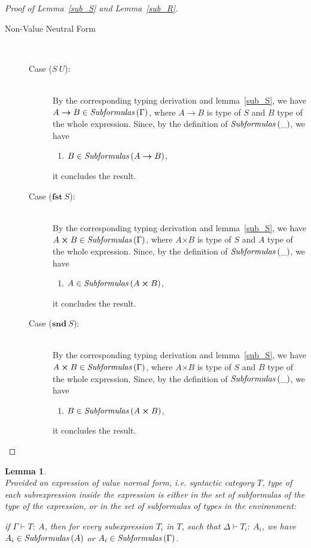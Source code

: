 \documentclass[a4paper]{article}
\newcommand{\typecolor}{}
\newcommand{\termcolor}{}
\newcommand{\tp}[1]{{\typecolor #1}}
\newcommand{\tm}[1]{{\termcolor #1}}
\newtheorem{lemma}[theorem]{Lemma}
\newcommand{\typarr}[2]{#1\boldsymbol{\rightarrow}#2}
\newcommand{\typprd}[2]{#1\boldsymbol{\times}#2}
\newcommand{\expapp}[2]{#1\ #2}
\newcommand{\expfst}[1]{\mathbf{fst}\ #1}
\newcommand{\expsnd}[1]{\mathbf{snd}\ #1}
\newcommand{\typing}[2]{\tm{#1:\ }\tp{#2}}
\newcommand{\txt}[1]{\text{\textit{#1}}}
\newcommand{\subformulas}[1]{\txt{Subformulas}\,(#1)}
\begin{document}
\begin{proof}[Proof of Lemma~\ref{sub_S} and Lemma~\ref{sub_R}]
\begin{description}
\item[Non-Value Neutral Form]\ \\
\begin{description}
\item[Case ($\expapp{S}{U}$):]\ \\ 
  By the corresponding typing derivation and lemma~\ref{sub_S}, we
  have $\typarr{A}{B} \in \subformulas{\Gamma}$, where $\typarr{A}{B}$
  is type of $S$ and $B$ type of the whole expression. Since, by the
  definition of $\subformulas{\_}$, we have
  \begin{enumerate}[] 
  \item  $B \in \subformulas{\typarr{A}{B}}$,
  \end{enumerate}
  it concludes the result.
\item[Case ($\expfst{S}$):]\ \\
  By the corresponding typing derivation and lemma~\ref{sub_S}, we
  have $\typprd{A}{B} \in \subformulas{\Gamma}$, where $\typprd{A}{B}$
  is type of $S$ and $A$ type of the whole expression. Since, by the
  definition of $\subformulas{\_}$, we have
  \begin{enumerate}[] 
  \item $A \in \subformulas{\typprd{A}{B}}$,
  \end{enumerate}
  it concludes the result.
\item[Case ($\expsnd{S}$):]\ \\
  By the corresponding typing derivation and lemma~\ref{sub_S}, we
  have $\typprd{A}{B} \in \subformulas{\Gamma}$, where $\typprd{A}{B}$
  is type of $S$ and $B$ type of the whole expression. Since, by the
  definition of $\subformulas{\_}$, we have
  \begin{enumerate}[] 
  \item $B \in \subformulas{\typprd{A}{B}}$,
  \end{enumerate}
  it concludes the result.
\end{description}
\end{description}
\end{proof}

\begin{lemma}\ \\
\label{sub_V}
Provided an expression of value normal form, i.e. syntactic
category $T$, type of each subrexpression inside the expression is
either in the set of subformulas of the type of the expression, or in
the set of subformulas of types in the environment:

 if $\Gamma \vdash \typing{T}{A}$, then for every subexpression $T_i$
 in $T$, such that $\Delta \vdash \typing{T_i}{A_i}$, we have $A_i \in
 \subformulas{A}$ or $A_i \in \subformulas{\Gamma}$. 
\end{lemma}
\end{document}
